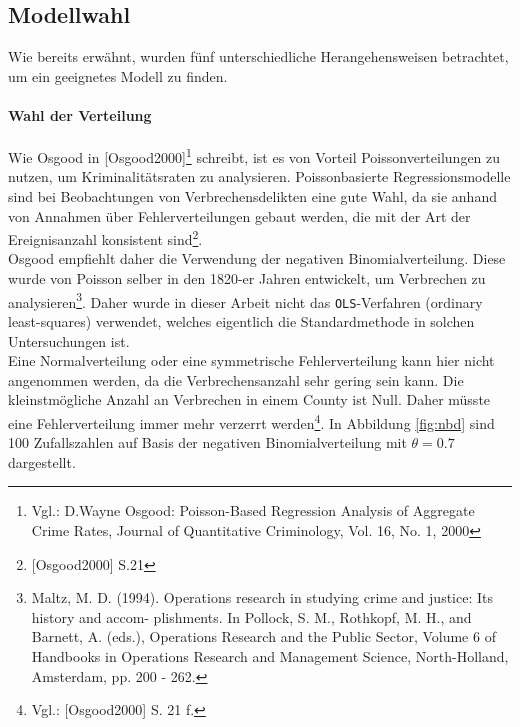 \subsection{Modellwahl}
Wie bereits erw\"ahnt, wurden f\"unf unterschiedliche Herangehensweisen betrachtet, um ein geeignetes Modell zu finden.

\paragraph{Wahl der Verteilung}
Wie Osgood in [Osgood2000]\footnote{Vgl.: D.Wayne Osgood: Poisson-Based Regression Analysis of Aggregate
Crime Rates, Journal of Quantitative Criminology, Vol. 16, No. 1, 2000}
schreibt, ist es von Vorteil Poissonverteilungen zu nutzen, um Kriminalit\"atsraten zu analysieren.
Poissonbasierte Regressionsmodelle sind bei Beobachtungen von Verbrechensdelikten eine gute Wahl, da sie anhand von Annahmen \"uber Fehlerverteilungen gebaut werden, die mit der Art der Ereignisanzahl konsistent sind\footnote{[Osgood2000] S.21}. \\
Osgood empfiehlt daher die Verwendung der negativen Binomialverteilung. Diese wurde von Poisson selber in den 1820-er Jahren entwickelt, um Verbrechen zu analysieren\footnote{Maltz, M. D. (1994). Operations research in studying crime and justice: Its history and accom-
plishments. In Pollock, S. M., Rothkopf, M. H., and Barnett, A. (eds.), Operations
Research and the Public Sector, Volume 6 of Handbooks in Operations Research and
Management Science, North-Holland, Amsterdam, pp. 200 - 262.}.
Daher wurde in dieser Arbeit nicht das \texttt{OLS}-Verfahren (ordinary least-squares) verwendet, welches eigentlich die Standardmethode in solchen Untersuchungen ist. \\
Eine Normalverteilung oder eine symmetrische Fehlerverteilung kann hier nicht angenommen werden, da die Verbrechensanzahl sehr gering sein kann.
Die kleinstm\"ogliche Anzahl an Verbrechen in einem County ist Null.
Daher m\"usste eine Fehlerverteilung immer mehr verzerrt werden\footnote{Vgl.: [Osgood2000] S. 21 f.}.
In Abbildung \ref{fig:nbd} sind 100 Zufallszahlen auf Basis der negativen Binomialverteilung mit $\theta = 0.7$ dargestellt.

